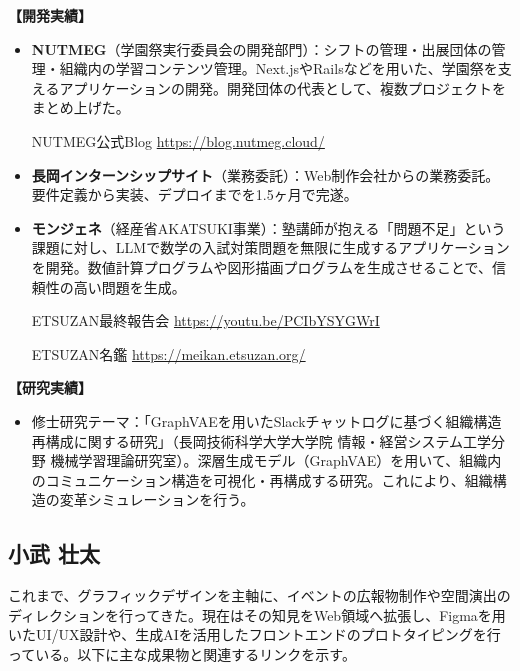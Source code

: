 \documentclass[paper=a4,fontsize=10.5bp,jafontsize=10.5bp,twocolumn]{jlreq}
\begin{document}
\textbf{【開発実績】}
\begin{itemize}
  \item \textbf{NUTMEG}（学園祭実行委員会の開発部門）：シフトの管理・出展団体の管理・組織内の学習コンテンツ管理。Next.jsやRailsなどを用いた、学園祭を支えるアプリケーションの開発。開発団体の代表として、複数プロジェクトをまとめ上げた。

  NUTMEG公式Blog \url{https://blog.nutmeg.cloud/}
  \item \textbf{長岡インターンシップサイト}（業務委託）：Web制作会社からの業務委託。要件定義から実装、デプロイまでを1.5ヶ月で完遂。
  \item \textbf{モンジェネ}（経産省AKATSUKI事業）：塾講師が抱える「問題不足」という課題に対し、LLMで数学の入試対策問題を無限に生成するアプリケーションを開発。数値計算プログラムや図形描画プログラムを生成させることで、信頼性の高い問題を生成。

  ETSUZAN最終報告会 \url{https://youtu.be/PCIbYSYGWrI}

  ETSUZAN名鑑 \url{https://meikan.etsuzan.org/}
\end{itemize}

\textbf{【研究実績】}
\begin{itemize}
  \item 修士研究テーマ：「GraphVAEを用いたSlackチャットログに基づく組織構造再構成に関する研究」（長岡技術科学大学大学院 情報・経営システム工学分野 機械学習理論研究室）。深層生成モデル（GraphVAE）を用いて、組織内のコミュニケーション構造を可視化・再構成する研究。これにより、組織構造の変革シミュレーションを行う。
\end{itemize}

\subsection*{小武 壮太}

これまで、グラフィックデザインを主軸に、イベントの広報物制作や空間演出のディレクションを行ってきた。現在はその知見をWeb領域へ拡張し、Figmaを用いたUI/UX設計や、生成AIを活用したフロントエンドのプロトタイピングを行っている。以下に主な成果物と関連するリンクを示す。
\end{document}

